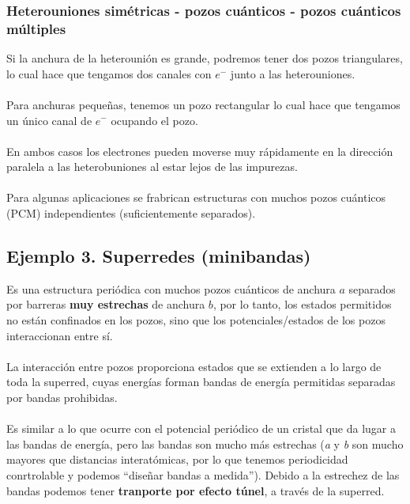 \subsubsection{Heterouniones simétricas - pozos cuánticos - pozos cuánticos múltiples}
Si la anchura de la heterounión es grande, podremos tener dos pozos triangulares, lo cual hace que tengamos dos canales con $e^-$ junto a las heterouniones.
\\\\
Para anchuras pequeñas, tenemos un pozo rectangular lo cual hace que tengamos un único canal de $e^-$ ocupando el pozo.\\\\
En ambos casos los electrones pueden moverse muy rápidamente en la dirección paralela a las heterobuniones al estar lejos de las impurezas.\\\\
Para algunas aplicaciones se frabrican estructuras con muchos pozos cuánticos (PCM) independientes (suficientemente separados).
\subsection{Ejemplo 3. Superredes (minibandas)}
Es una estructura periódica con muchos pozos cuánticos de anchura $a$ separados por barreras \textbf{muy estrechas} de anchura $b$, por lo tanto, los estados permitidos no están confinados en los pozos, sino que los potenciales/estados de los pozos interaccionan entre sí.\\\\
La interacción entre pozos proporciona estados que se extienden a lo largo de toda la superred, cuyas energías forman bandas de energía permitidas separadas por bandas prohibidas.\\\\
Es similar a lo que ocurre con el potencial periódico de un cristal que da lugar a las bandas de energía, pero las bandas son mucho más estrechas (\textit{a} y \textit{b} son mucho mayores que distancias interatómicas, por lo que tenemos periodicidad conrtrolable y podemos ``diseñar bandas a medida'').  Debido a la estrechez de las bandas podemos tener \textbf{tranporte por efecto túnel}, a través de la superred.
